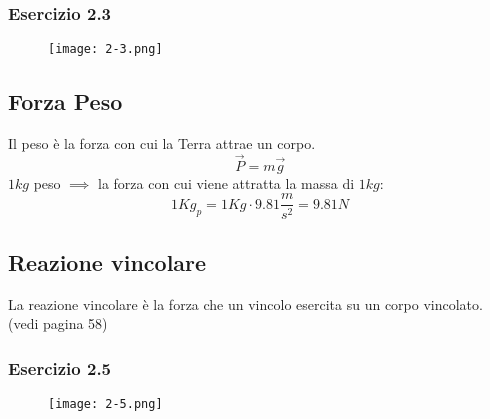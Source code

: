 \documentclass[../../main.tex]{subfiles}
\begin{document}
\subsubsection{Esercizio 2.3}
\begin{figure}[H]
    \centering
    \texttt{[image: 2-3.png]}
\end{figure}

\subsection{Forza Peso}
Il peso è la forza con cui la Terra attrae un corpo.
\[
    \vec P = m\vec g
\]
$1kg$ peso $\implies$ la forza con cui viene attratta la massa di $1kg$:
\[
    1Kg_p = 1Kg \cdot 9.81\dfrac{m}{s^2} = 9.81N
\]

\subsection{Reazione vincolare}
La reazione vincolare è la forza che un vincolo esercita su un corpo vincolato.
(vedi pagina 58)

\subsubsection{Esercizio 2.5}
\begin{figure}[H]
    \centering
    \texttt{[image: 2-5.png]}
\end{figure}
\end{document}
